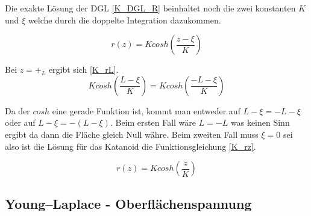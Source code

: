 \begin{refsection}
Die exakte Lösung der DGL \eqref{K_DGL_R} beinhaltet noch die zwei konstanten $K$ und $\xi$ welche durch die doppelte Integration dazukommen.

\begin{equation} \label{K_r}
r(z)=K cosh(\frac{z-\xi}{K})
\end{equation}

Bei $z=+_L$ ergibt sich \eqref{K_rL}.
\begin{equation} \label{K_rL}
K cosh(\frac{L-\xi}{K})=K cosh(\frac{-L-\xi}{K})
\end{equation}

Da der $cosh$ eine gerade Funktion ist, kommt man entweder auf $L-\xi=-L-\xi$ oder auf $L-\xi=-(L-\xi)$.
Beim ersten Fall wäre $L=-L$ was keinen Sinn ergibt da dann die Fläche gleich Null währe. Beim zweiten Fall muss $\xi=0$ sei also ist die Lösung für das Katanoid die Funktionsgleichung \eqref{K_rz}.

\begin{equation} \label{K_rz}
r(z)=K cosh(\frac{z}{K})
\end{equation}






\subsection{Young–Laplace - Oberflächenspannung}
\printbibliography[heading=subbibliography]
\end{refsection}